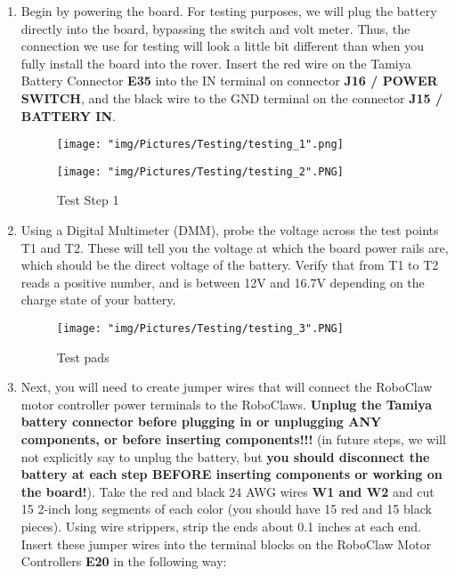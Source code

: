 \documentclass{article}
\begin{document}
\begin{enumerate}

\item Begin by powering the board. For testing purposes, we will plug the battery directly into the board, bypassing the switch and volt meter.  Thus, the connection we use for testing will look a little bit different than when you fully install the board into the rover. Insert the red wire on the Tamiya Battery Connector \textbf{E35} into the IN terminal on connector \textbf{J16 / POWER SWITCH}, and the black wire to the GND terminal on the connector \textbf{J15 / BATTERY IN}.

\begin{figure}[H]
  \centering
  \begin{minipage}[b]{0.45\textwidth}
    \texttt{[image: "img/Pictures/Testing/testing\_1".png]}
  \end{minipage}
  \hfill
  \begin{minipage}[b]{0.45\textwidth}
    \texttt{[image: "img/Pictures/Testing/testing\_2".PNG]}
  \end{minipage}
  \caption{Test Step 1}
  \label{test_1}
\end{figure}

\item Using a Digital Multimeter (DMM), probe the voltage across the test points T1 and T2. These will tell you the voltage at which the board power rails are, which should be the direct voltage of the battery. Verify that from T1 to T2 reads a positive number, and is between 12V and 16.7V depending on the charge state of your battery. 

\begin{figure}[H]
  \centering
    \texttt{[image: "img/Pictures/Testing/testing\_3".PNG]}
  \caption{Test pads}
  \label{test_pads_1}
\end{figure}

\item Next, you will need to create jumper wires that will connect the RoboClaw motor controller power terminals to the RoboClaws. \textbf{Unplug the Tamiya battery connector before plugging in or unplugging ANY components, or before inserting components!!!}  (in future steps, we will not explicitly say to unplug the battery, but \textbf{you should disconnect the battery at each step BEFORE inserting components or working on the board!}). Take the red and black 24 AWG wires \textbf{W1 and W2} and cut 15 2-inch long segments of each color (you should have 15 red and 15 black pieces). Using wire strippers, strip the ends about 0.1 inches at each end. Insert these jumper wires into the terminal blocks on the RoboClaw Motor Controllers \textbf{E20} in the following way:


\end{enumerate}
\end{document}

